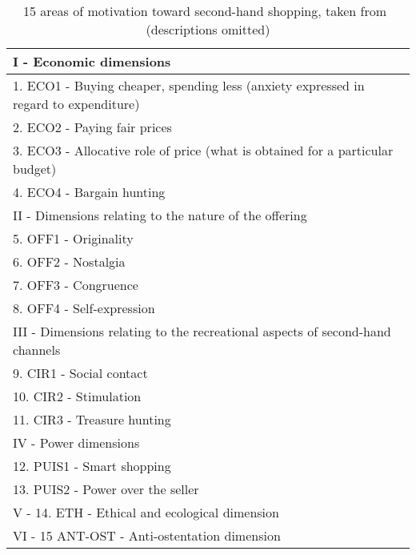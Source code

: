 \begin{table}[ht]
	\begin{tabular}{p{}}
		\toprule
		I - Economic dimensions                                                              \\\midrule
		1. ECO1 - Buying cheaper, spending less (anxiety expressed in regard to expenditure) \\
		2. ECO2 - Paying fair prices                                                         \\
		3. ECO3 - Allocative role of price (what is obtained for a particular budget)        \\
		4. ECO4 - Bargain hunting                                                            \\
		\toprule
		II - Dimensions relating to the nature of the offering                               \\\midrule
		5. OFF1 - Originality                                                                \\
		6. OFF2 - Nostalgia                                                                  \\
		7. OFF3 - Congruence                                                                 \\
		8. OFF4 - Self-expression                                                            \\
		\toprule
		III - Dimensions relating to the recreational aspects of second-hand channels        \\\midrule
		9. CIR1 - Social contact                                                             \\
		10. CIR2 - Stimulation                                                               \\
		11. CIR3 - Treasure hunting                                                          \\
		\toprule
		IV - Power dimensions                                                                \\\midrule
		12. PUIS1 - Smart shopping                                                           \\
		13. PUIS2 - Power over the seller                                                    \\
		\toprule
		V - 14. ETH - Ethical and ecological dimension                                       \\
		\toprule
		VI - 15 ANT-OST - Anti-ostentation dimension                                         \\
		\bottomrule
	\end{tabular}
	\caption{15 areas of motivation toward second-hand shopping, taken from~\cite{SecondHandMotives} (descriptions omitted)}\label{tab:SecondHandMotives}
\end{table}

